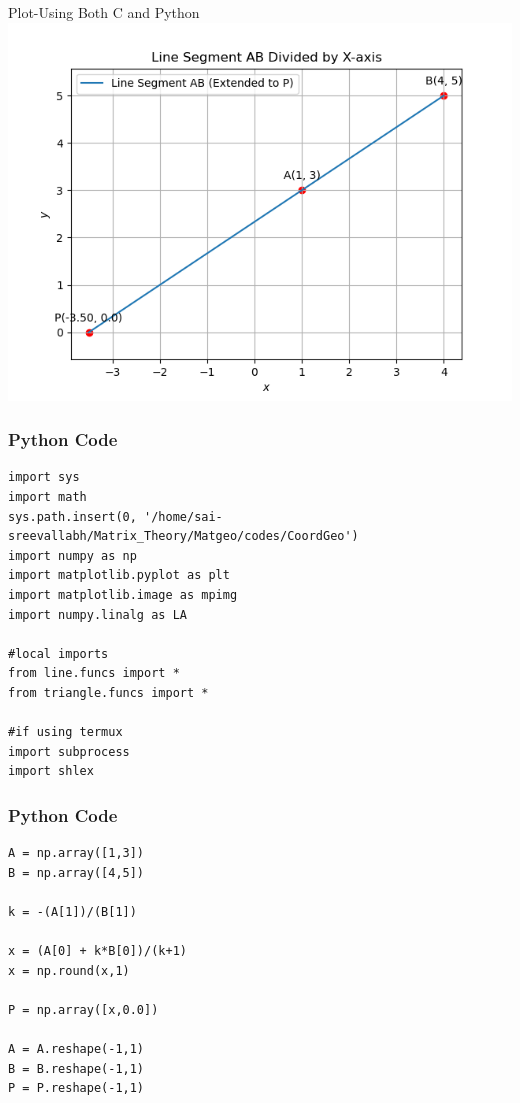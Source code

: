 \documentclass{beamer}
\begin{document}
\begin{frame}{Plot-Using Both C and Python}
    \centering
    \includegraphics[width=\columnwidth, height=0.8\textheight, keepaspectratio]{Figs/plot(py+C).png}     
\end{frame}



\begin{frame}[fragile]
    \frametitle{Python Code}
    \begin{lstlisting}
import sys
import math
sys.path.insert(0, '/home/sai-sreevallabh/Matrix_Theory/Matgeo/codes/CoordGeo')
import numpy as np
import matplotlib.pyplot as plt
import matplotlib.image as mpimg
import numpy.linalg as LA

#local imports
from line.funcs import *
from triangle.funcs import *

#if using termux
import subprocess
import shlex

\end{lstlisting}
\end{frame}

\begin{frame}[fragile]
    \frametitle{Python Code}
    \begin{lstlisting}
A = np.array([1,3])
B = np.array([4,5])

k = -(A[1])/(B[1])

x = (A[0] + k*B[0])/(k+1)
x = np.round(x,1)

P = np.array([x,0.0])

A = A.reshape(-1,1)
B = B.reshape(-1,1)
P = P.reshape(-1,1)
\end{lstlisting}
\end{frame}
\end{document}
